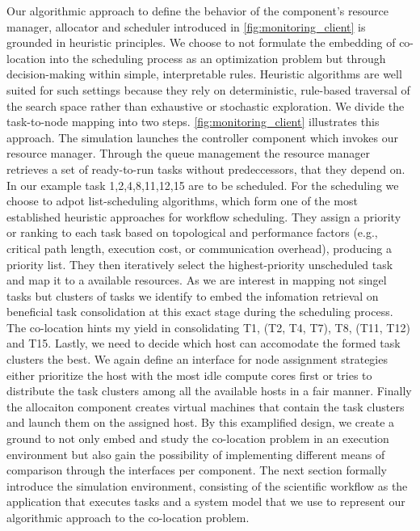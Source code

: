 Our algorithmic approach to define the behavior of the component's resource manager, allocator and scheduler introduced in \ref{fig:monitoring_client} is grounded in heuristic principles.
We choose to not formulate the embedding of co-location into the scheduling process as an optimization problem but through decision-making within simple, interpretable rules. Heuristic algorithms are well suited for such settings because they rely on deterministic, rule-based traversal of the search space rather than exhaustive or stochastic exploration.  We divide the task-to-node mapping into two steps. \ref{fig:monitoring_client} illustrates this approach.  The simulation launches the controller component which invokes our resource manager. Through the queue management the resource manager retrieves a set of ready-to-run tasks without predeccessors, that they depend on. In our example task 1,2,4,8,11,12,15 are to be scheduled. For the scheduling we choose to adpot list-scheduling algorithms, which form one of the most established heuristic approaches for workflow scheduling. They assign a priority or ranking to each task based on topological and performance factors (e.g., critical path length, execution cost, or communication overhead), producing a priority list. They then iteratively select the highest-priority unscheduled task and map it to a available resources. As we are interest in mapping not singel tasks but clusters of tasks we identify to embed the infomation retrieval on beneficial task consolidation at this exact stage during the scheduling process. The co-location hints my yield in consolidating T1, (T2, T4, T7), T8, (T11, T12) and T15. Lastly, we need to decide which host can accomodate the formed task clusters the best. We again define an interface for node assignment strategies either prioritize the host with the most idle compute cores first or tries to distribute the task clusters among all the available hosts in a fair manner. Finally the allocaiton component creates virtual machines that contain the task clusters and launch them on the assigned host. By this examplified design, we create a ground to not only embed and study the co-location problem in an execution environment but also gain the possibility of implementing different means of comparison through the interfaces per component. The next section formally introduce the simulation environment, consisting of the scientific workflow as the application that executes tasks and a system model that we use to represent our algorithmic approach to the co-location problem.

